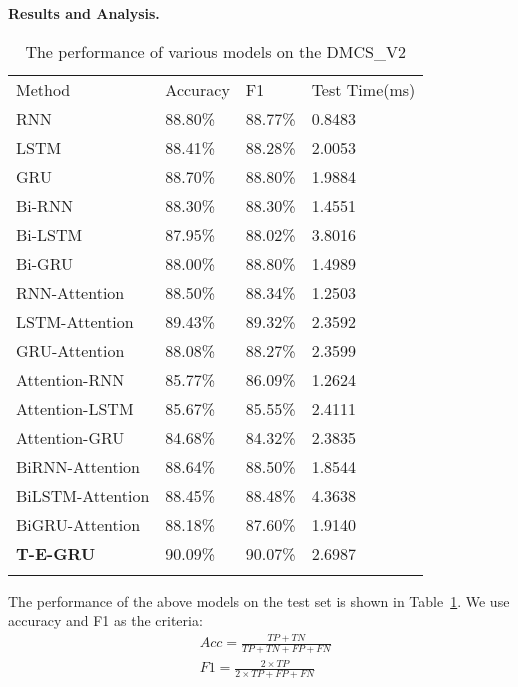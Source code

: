 \textbf{Results and Analysis.}
\label{sec:Douban_result}
\begin{table}
	\caption{The performance of various models on the DMCS\_V2}
	\label{tab:DMSC_v2-Result}       
	\begin{tabular}{llll}
		\hline\noalign{\smallskip}
		Method 		                &Accuracy 		    &F1			        &Test Time(ms)\\
		\noalign{\smallskip}\hline\noalign{\smallskip}
	    RNN~\cite{RNN-first}	        &88.80\%	        &88.77\%            &0.8483\\
		LSTM~\cite{hochreiter1997LSTM}  &88.41\% 			&88.28\% 	        &2.0053\\
		GRU~\cite{cho2014learningGRU}	&88.70\%  			&88.80\%	        &1.9884\\
		Bi-RNN						    &88.30\%			&88.30\%	        &1.4551\\
		Bi-LSTM						    &87.95\%			&88.02\%	        &3.8016\\
		Bi-GRU						    &88.00\%			&88.80\%	        &1.4989\\
		\noalign{\smallskip}\hline\noalign{\smallskip}
		RNN-Attention				    &88.50\%			&88.34\%	        &1.2503\\
		LSTM-Attention	                &89.43\%	        &89.32\%	        &2.3592\\
		GRU-Attention				    &88.08\%	        &88.27\%	        &2.3599\\
		Attention-RNN				    &85.77\%			&86.09\%	        &1.2624\\
		Attention-LSTM				    &85.67\%			&85.55\%	        &2.4111\\
		Attention-GRU				    &84.68\%			&84.32\%	        &2.3835\\
		BiRNN-Attention			        &88.64\%			&88.50\%	        &1.8544\\
		BiLSTM-Attention			    &88.45\%			&88.48\%	        &4.3638\\
		BiGRU-Attention			        &88.18\%			&87.60\%	        &1.9140\\
		\noalign{\smallskip}\hline\noalign{\smallskip}
		\textbf{T-E-GRU}		        &90.09\%	        &90.07\%	        &2.6987\\
		\noalign{\smallskip}\hline
	\end{tabular}
\end{table}
The performance of the above models on the test set is shown in Table~\ref{tab:DMSC_v2-Result}. 
We use accuracy and F1 as the criteria: 
\begin{equation}
    \label{equation:Acc&F1}
	\begin{split}
	&Acc = \frac{TP+TN}{TP+TN+FP+FN}\\
	&F1 = \frac{2 \times TP}{2\times TP +FP +FN}
	\end{split}
\end{equation}
